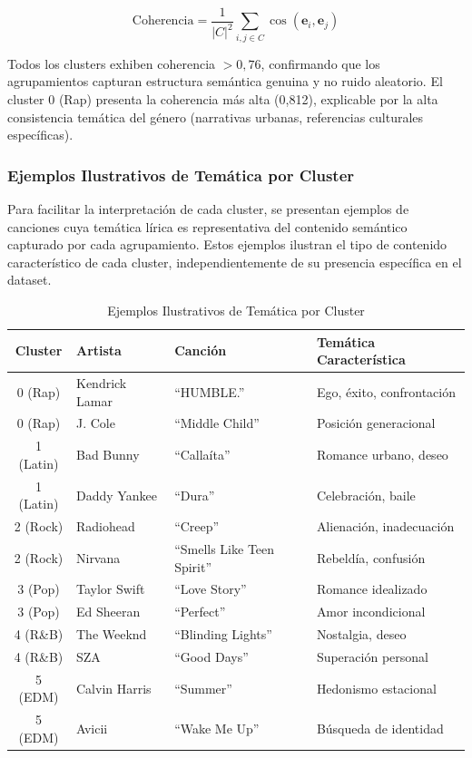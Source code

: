\begin{equation}
\label{eq:coherencia}
\text{Coherencia} = \frac{1}{|C|^2} \sum_{i,j \in C} \cos(\mathbf{e}_i, \mathbf{e}_j)
\end{equation}

Todos los clusters exhiben coherencia $> 0{,}76$, confirmando que los agrupamientos capturan estructura semántica genuina y no ruido aleatorio. El cluster 0 (Rap) presenta la coherencia más alta (0,812), explicable por la alta consistencia temática del género (narrativas urbanas, referencias culturales específicas).

\subsubsection{Ejemplos Ilustrativos de Temática por Cluster}

Para facilitar la interpretación de cada cluster, se presentan ejemplos de canciones cuya temática lírica es representativa del contenido semántico capturado por cada agrupamiento. Estos ejemplos ilustran el tipo de contenido característico de cada cluster, independientemente de su presencia específica en el dataset.

\begin{table}[htbp]
\centering
\caption{Ejemplos Ilustrativos de Temática por Cluster}
\label{tab:ejemplos-clusters}
\begin{tabular}{clll}
\toprule
\textbf{Cluster} & \textbf{Artista} & \textbf{Canción} & \textbf{Temática Característica} \\
\midrule
0 (Rap) & Kendrick Lamar & ``HUMBLE.'' & Ego, éxito, confrontación \\
0 (Rap) & J. Cole & ``Middle Child'' & Posición generacional \\
1 (Latin) & Bad Bunny & ``Callaíta'' & Romance urbano, deseo \\
1 (Latin) & Daddy Yankee & ``Dura'' & Celebración, baile \\
2 (Rock) & Radiohead & ``Creep'' & Alienación, inadecuación \\
2 (Rock) & Nirvana & ``Smells Like Teen Spirit'' & Rebeldía, confusión \\
3 (Pop) & Taylor Swift & ``Love Story'' & Romance idealizado \\
3 (Pop) & Ed Sheeran & ``Perfect'' & Amor incondicional \\
4 (R\&B) & The Weeknd & ``Blinding Lights'' & Nostalgia, deseo \\
4 (R\&B) & SZA & ``Good Days'' & Superación personal \\
5 (EDM) & Calvin Harris & ``Summer'' & Hedonismo estacional \\
5 (EDM) & Avicii & ``Wake Me Up'' & Búsqueda de identidad \\
\bottomrule
\end{tabular}
\end{table}

